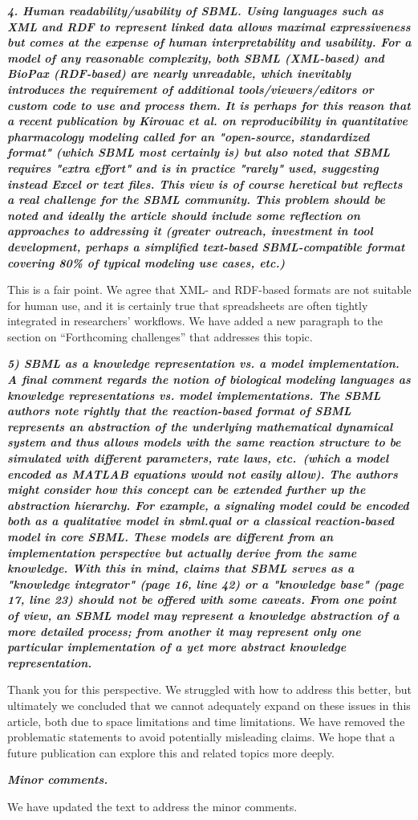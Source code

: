 \documentclass[11pt]{mhletter}
\begin{document}
\textbf{\textit{4. Human readability/usability of SBML. Using languages such as XML and RDF to represent linked data allows maximal expressiveness but comes at the expense of human interpretability and usability. For a model of any reasonable complexity, both SBML (XML-based) and BioPax (RDF-based) are nearly unreadable, which inevitably introduces the requirement of additional tools/viewers/editors or custom code to use and process them. It is perhaps for this reason that a recent publication by Kirouac et al. on reproducibility in quantitative pharmacology modeling  called for an "open-source, standardized format" (which SBML most certainly is) but also noted that SBML requires "extra effort" and is in practice "rarely" used, suggesting instead Excel or text files. This view is of course heretical but reflects a real challenge for the SBML community. This problem should be noted and ideally the article should include some reflection on approaches to addressing it (greater outreach, investment in tool development, perhaps a simplified text-based SBML-compatible format covering 80\% of typical modeling use cases, etc.)}}

This is a fair point.  We agree that XML- and RDF-based formats are not suitable for human use, and it is certainly true that spreadsheets are often tightly integrated in researchers' workflows.  We have added a new paragraph to the section on ``Forthcoming challenges'' that addresses this topic.


\textbf{\textit{5) SBML as a knowledge representation vs. a model implementation.  A final comment regards the notion of biological modeling languages as knowledge representations vs. model implementations. The SBML authors note rightly that the reaction-based format of SBML represents an abstraction of the underlying mathematical dynamical system and thus allows models with the same reaction structure to be simulated with different parameters, rate laws, etc.\ (which a model encoded as MATLAB equations would not easily allow). The authors might consider how this concept can be extended further up the abstraction hierarchy. For example, a signaling model could be encoded both as a qualitative model in sbml.qual or a classical reaction-based model in core SBML. These models are different from an implementation perspective but actually derive from the same knowledge. With this in mind, claims that SBML serves as a "knowledge integrator" (page 16, line 42) or a "knowledge base" (page 17, line 23) should not be offered with some caveats. From one point of view, an SBML model may represent a knowledge abstraction of a more detailed process; from another it may represent only one particular implementation of a yet more abstract knowledge representation.}}

Thank you for this perspective.  We struggled with how to address this better, but ultimately we concluded that we cannot adequately expand on these issues in this article, both due to space limitations and time limitations.  We have removed the problematic statements to avoid potentially misleading claims.  We hope that a future publication can explore this and related topics more deeply.


\textbf{\textit{Minor comments.}}

We have updated the text to address the minor comments.
\end{document}
